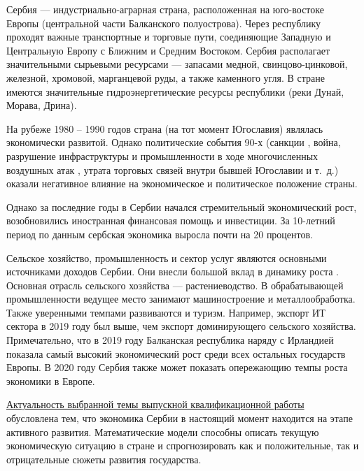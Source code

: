 \intro

Сербия --- индустриально-аграрная страна, расположенная на юго-востоке Европы (центральной части Балканского полуострова).
Через республику проходят важные транспортные и торговые пути, соединяющие Западную и Центральную Европу с Ближним и Средним Востоком.
Сербия располагает значительными сырьевыми ресурсами --- запасами медной, свинцово-цинковой, железной, хромовой, марганцевой руды, а также каменного угля.
В стране имеются значительные гидроэнергетические ресурсы республики (реки Дунай, Морава, Дрина).

На рубеже 1980 -- 1990 годов страна (на тот момент Югославия) являлась экономически развитой.
Однако политические события 90-х (санкции , война, разрушение инфраструктуры и промышленности в ходе многочисленных воздушных атак , утрата торговых связей внутри бывшей Югославии и т.~д.) оказали негативное влияние на экономическое и политическое положение страны.

Однако за последние годы в Сербии начался стремительный экономический рост, возобновились иностранная финансовая помощь и инвестиции.
За 10-летний период по данным  сербская экономика выросла почти на 20 процентов.

Сельское хозяйство, промышленность и сектор услуг являются основными источниками доходов Сербии.
Они внесли большой вклад в динамику роста .
Основная отрасль сельского хозяйства --- растениеводство.
В обрабатывающей промышленности ведущее место занимают машиностроение и металлообработка.
Также уверенными темпами развиваются  и туризм.
Например, экспорт ИТ сектора в 2019 году был выше, чем экспорт доминирующего сельского хозяйства.
Примечательно, что в 2019 году Балканская республика наряду с Ирландией показала самый высокий экономический рост среди всех остальных государств Европы.
В 2020 году Сербия также может показать опережающию темпы роста экономики в Европе.

\underline{Актуальность выбранной темы выпускной квалификационной работы } обусловлена тем, что экономика Сербии в настоящий момент находится на этапе активного развития.
Математические модели способны описать текущую экономическую ситуацию в стране и спрогнозировать как и положительные, так и отрицательные сюжеты развития государства.

